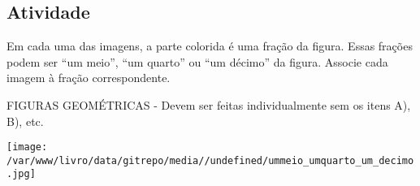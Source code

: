 \documentclass[a4,12pt]{book}
\begin{document}
\subsection{Atividade}










Em cada uma das imagens, a parte colorida é uma fração da figura. Essas frações podem ser ``um meio'', ``um quarto'' ou ``um décimo'' da figura. Associe cada imagem à fração correspondente.

\begin{imagem*}[breakable]{}{}   FIGURAS GEOMÉTRICAS - Devem ser feitas individualmente sem os itens A), B), etc.  
  
    \texttt{[image: /var/www/livro/data/gitrepo/media//undefined/ummeio\_umquarto\_um\_decimo.jpg]}  
  
  
\end{imagem*}
\end{document}
